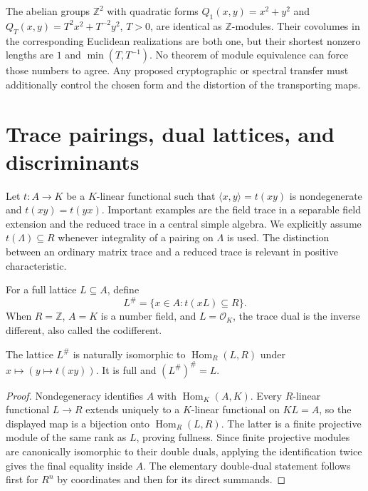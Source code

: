 \begin{example}
The abelian groups $\mathbb Z^2$ with quadratic forms
$Q_1(x,y)=x^2+y^2$ and
$Q_T(x,y)=T^2x^2+T^{-2}y^2$, $T>0$, are identical as
$\mathbb Z$-modules. Their covolumes in the corresponding
Euclidean realizations are both one, but their shortest nonzero
lengths are $1$ and $\min(T,T^{-1})$. No theorem of module
equivalence can force those numbers to agree. Any proposed
cryptographic or spectral transfer must additionally control the
chosen form and the distortion of the transporting maps.
\end{example}

\section{Trace pairings, dual lattices, and discriminants}

Let $t:A\to K$ be a $K$-linear functional such that
$\langle x,y\rangle=t(xy)$ is nondegenerate and
$t(xy)=t(yx)$. Important examples are the field trace in a
separable field extension and the reduced trace in a central simple
algebra. We explicitly assume $t(\Lambda)\subseteq R$ whenever
integrality of a pairing on $\Lambda$ is used. The distinction
between an ordinary matrix trace and a reduced trace is relevant
in positive characteristic.

\begin{definition}
For a full lattice $L\subseteq A$, define
\[
 L^{\#}=\{x\in A:t(xL)\subseteq R\}.
\]
When $R=\mathbb Z$, $A=K$ is a number field, and
$L=\mathcal O_K$, the trace dual is the inverse different,
also called the codifferent.
\end{definition}

\begin{proposition}
\label{prop:trace-dual}
The lattice $L^{\#}$ is naturally isomorphic to
$\operatorname{Hom}_R(L,R)$ under $x\mapsto(y\mapsto t(xy))$.
It is full and $(L^{\#})^{\#}=L$.
\end{proposition}

\begin{proof}
Nondegeneracy identifies $A$ with $\operatorname{Hom}_K(A,K)$.
Every $R$-linear functional $L\to R$ extends uniquely to a
$K$-linear functional on $KL=A$, so the displayed map is a
bijection onto $\operatorname{Hom}_R(L,R)$. The latter is a
finite projective module of the same rank as $L$, proving fullness.
Since finite projective modules are canonically isomorphic to their
double duals, applying the identification twice gives the final
equality inside $A$. The elementary double-dual statement follows
first for $R^n$ by coordinates and then for its direct summands.
\end{proof}

